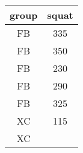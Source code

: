 \documentclass[]{book}
\theoremstyle{definition}
\theoremstyle{definition}
\theoremstyle{definition}
\theoremstyle{remark}
\begin{document}
\begin{longtable}[]{@{}cc@{}}
\toprule
\begin{minipage}[b]{0.10\columnwidth}\centering\strut
group\strut
\end{minipage} & \begin{minipage}[b]{0.10\columnwidth}\centering\strut
squat\strut
\end{minipage}\tabularnewline
\midrule
\endhead
\begin{minipage}[t]{0.10\columnwidth}\centering\strut
FB\strut
\end{minipage} & \begin{minipage}[t]{0.10\columnwidth}\centering\strut
335\strut
\end{minipage}\tabularnewline
\begin{minipage}[t]{0.10\columnwidth}\centering\strut
FB\strut
\end{minipage} & \begin{minipage}[t]{0.10\columnwidth}\centering\strut
350\strut
\end{minipage}\tabularnewline
\begin{minipage}[t]{0.10\columnwidth}\centering\strut
FB\strut
\end{minipage} & \begin{minipage}[t]{0.10\columnwidth}\centering\strut
230\strut
\end{minipage}\tabularnewline
\begin{minipage}[t]{0.10\columnwidth}\centering\strut
FB\strut
\end{minipage} & \begin{minipage}[t]{0.10\columnwidth}\centering\strut
290\strut
\end{minipage}\tabularnewline
\begin{minipage}[t]{0.10\columnwidth}\centering\strut
FB\strut
\end{minipage} & \begin{minipage}[t]{0.10\columnwidth}\centering\strut
325\strut
\end{minipage}\tabularnewline
\begin{minipage}[t]{0.10\columnwidth}\centering\strut
XC\strut
\end{minipage} & \begin{minipage}[t]{0.10\columnwidth}\centering\strut
115\strut
\end{minipage}\tabularnewline
\begin{minipage}[t]{0.10\columnwidth}\centering\strut
XC\strut
\end{minipage} & \begin{minipage}[t]{0.10\columnwidth}\centering\strut

\end{minipage}
\end{longtable}
\end{document}
